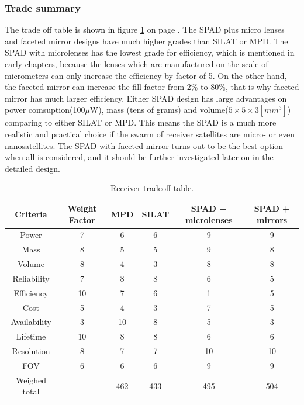 \subsubsection{Trade summary}
\label{TOReceiverS}
The trade off table is shown in figure \ref{table:receiverTradeTable} on page \pageref{table:receiverTradeTable}. The \acs{SPAD} plus micro lenses and faceted mirror designs have much higher grades than \acs{SILAT} or \acs{MPD}. The \acs{SPAD} with microlenses has the lowest grade for efficiency, which is mentioned in early chapters, because the lenses which are manufactured on the scale of micrometers can only increase the efficiency by factor of 5. On the other hand, the faceted mirror can increase the fill factor from 2\% to 80\%, that is why faceted mirror has much larger efficiency. Either \acs{SPAD} design has large advantages on power comsuption(100$\mu$W), mass (tens of grams) and volume($5\times5\times3[mm^{3}]$) comparing to either \acs{SILAT} or \acs{MPD}. This means the \ac{SPAD} is a much more realistic and practical choice if the swarm of receiver satellites are micro- or even nanosatellites. The \acs{SPAD} with faceted mirror turns out to be the best option when all is considered, and it should be further investigated later on in the detailed design.

\begin{table}[h]
	\centering
		\begin{tabular}{c|c|c|c|c|c}
		 \textbf{Criteria} & \textbf{Weight Factor} & \textbf{MPD} & \textbf{SILAT} & \textbf{SPAD + microlenses} & \textbf{SPAD + mirrors} \\ \hline \hline
		 Power & 7 & 6 & 6 & 9 & 9 \\ 
		 Mass & 8 & 5 & 5 & 9 & 8 \\
		 Volume & 8 & 4 & 3 & 8 & 8 \\
		 Reliability & 7 & 8 & 8 & 6 & 5 \\
		 Efficiency & 10 & 7 & 6 & 1 & 5 \\
		 Cost & 5 & 4 & 3 & 7 & 5 \\
		 Availability & 3 & 10 & 8 & 5 & 3 \\
		 Lifetime & 10 & 8 & 8 & 6 & 6 \\
		 Resolution & 8 & 7 & 7 & 10 & 10 \\
		 FOV & 6 & 6 & 6 & 9 & 9 \\ \hline
		 Weighed total &   & 462 & 433 & 495 & 504 \\
			
		\end{tabular}
	\caption{Receiver tradeoff table.}
	\label{table:receiverTradeTable}
\end{table}

